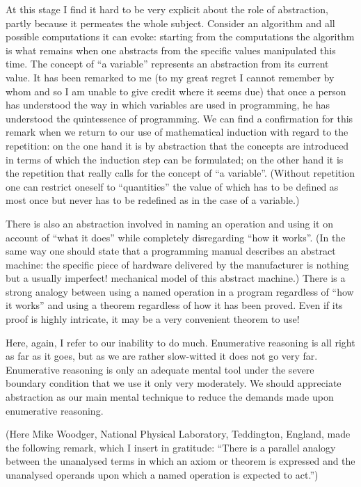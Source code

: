 At this stage I find it hard to be very explicit about the role of abstraction, partly because it permeates the whole subject. Consider an algorithm and all possible computations it can evoke: starting from the computations the algorithm is what remains when one abstracts from the specific values manipulated this time. The concept of ``a variable'' represents an abstraction from its current value. It has been remarked to me (to my great regret I cannot remember by whom and so I am unable to give credit where it seems due) that once a person has understood the way in which variables are used in programming, he has understood the quintessence of programming. We can find a confirmation for this remark when we return to our use of mathematical induction with regard to the repetition: on the one hand it is by abstraction that the concepts are introduced in terms of which the induction step can be formulated; on the other hand it is the repetition that really calls for the concept of ``a variable''. (Without repetition one can restrict oneself to ``quantities'' the value of which has to be defined as most once but never has to be redefined as in the case of a variable.)

There is also an abstraction involved in naming an operation and using it on account of ``what it does'' while completely disregarding ``how it works''. (In the same way one should state that a programming manual describes an abstract machine: the specific piece of hardware delivered by the manufacturer is nothing but a \textemdash{}  usually imperfect! \textemdash{}  mechanical model of this abstract machine.) There is a strong analogy between using a named operation in a program regardless of ``how it works'' and using a theorem regardless of how it has been proved. Even if its proof is highly intricate, it may be a very convenient theorem to use!

Here, again, I refer to our inability to do much. Enumerative reasoning is all right as far as it goes, but as we are rather slow-witted it does not go very
far. Enumerative reasoning is only an adequate mental tool under the severe boundary condition that we use it only very moderately. We should appreciate
abstraction as our main mental technique to reduce the demands made upon enumerative reasoning.

(Here Mike Woodger, National Physical Laboratory, Teddington, England, made the following remark, which I insert in gratitude: ``There is a parallel analogy between the unanalysed terms in which an axiom or theorem is expressed and the unanalysed operands upon which a named operation is expected to act.'')

